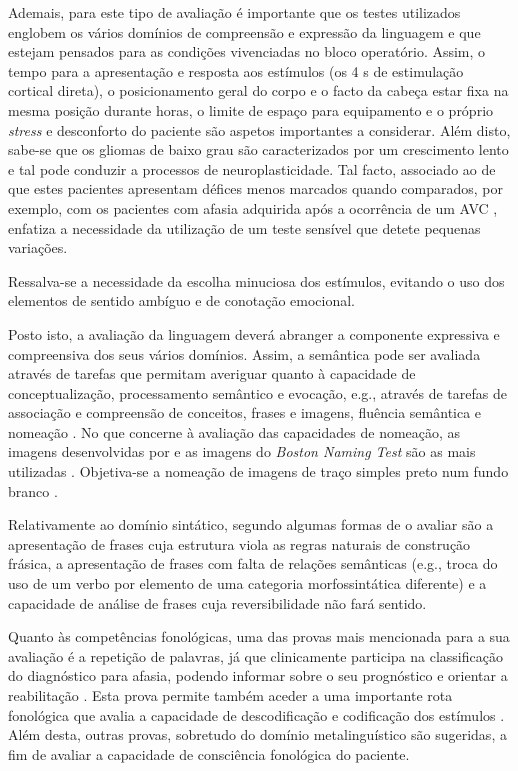 \documentclass[output=paper,colorlinks,citecolor=brown,booklanguage=portuguese]{langscibook}
\begin{document}
Ademais, para este tipo de avaliação é importante que os testes utilizados englobem os vários domínios de compreensão e expressão da linguagem e que estejam pensados para as condições vivenciadas no bloco operatório. Assim, o tempo para a apresentação e resposta aos estímulos (os 4 s de estimulação cortical direta), o posicionamento geral do corpo e o facto da cabeça estar fixa na mesma posição durante horas, o limite de espaço para equipamento e o próprio \emph{stress} e desconforto do paciente são aspetos importantes a considerar. Além disto, sa\-be-se que os gliomas de baixo grau são caracterizados por um crescimento lento e tal pode conduzir a processos de neuroplasticidade. Tal facto, associado ao de que estes pacientes apresentam défices menos marcados quando comparados, por exemplo, com os pacientes com afasia adquirida após a ocorrência de um AVC \citep{Desmurget2007, Geemen2014}, enfatiza a necessidade da utilização de um teste sensível que detete pequenas variações. 

Ressalva-se a necessidade da escolha minuciosa dos estímulos, evitando o uso dos elementos de sentido ambíguo e de conotação emocional. 

Posto isto, a avaliação da linguagem deverá abranger a componente expressiva e compreensiva dos seus vários domínios. Assim, a semântica pode ser avaliada através de tarefas que permitam averiguar quanto à capacidade de conceptualização, processamento semântico e evocação, e.g., através de tarefas de associação e compreensão de conceitos, frases e imagens, fluência semântica e nomeação \citep{Friederici2011}. No que concerne à avaliação das capacidades de nomeação, as imagens desenvolvidas por \citet{Snodgrass1980} e as imagens do \emph{Boston Naming Test} \citep{Goodglass2001} são as mais utilizadas \citep{Spezzano2010}. Objetiva-se a nomeação de imagens de traço simples preto num fundo branco \citep{Cervenka2013, Radanovic2004}.

Relativamente ao domínio sintático, segundo \citet{Friederici2011} algumas formas de o avaliar são a apresentação de frases cuja estrutura viola as regras naturais de construção frásica, a apresentação de frases com falta de relações semânticas (e.g., troca do uso de um verbo por elemento de uma categoria morfossintática diferente) e a capacidade de análise de frases cuja reversibilidade não fará sentido. 

Quanto às competências fonológicas, uma das provas mais mencionada para a sua avaliação é a repetição de palavras, já que clinicamente participa na classificação do diagnóstico para afasia, podendo informar sobre o seu prognóstico \citep{Hosomi2009} e orientar a reabilitação \citep{MoritzGasser2013, Schlaug2009}. Esta prova permite também aceder a uma importante rota fonológica que avalia a capacidade de descodificação e codificação dos estímulos \citep{Witte2015}. Além desta, outras provas, sobretudo do domínio metalinguístico são sugeridas, a fim de avaliar a capacidade de consciência fonológica do paciente.
\end{document}
